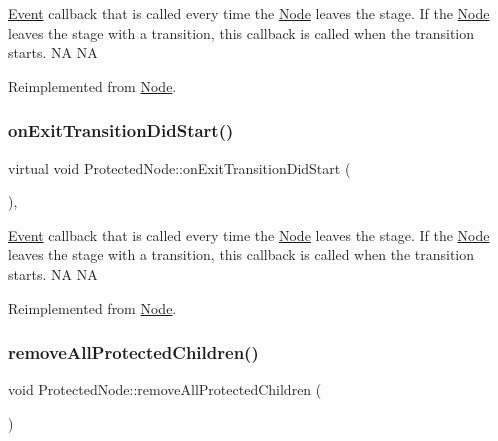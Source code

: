 \hyperlink{classEvent}{Event} callback that is called every time the \hyperlink{classNode}{Node} leaves the \textquotesingle{}stage\textquotesingle{}. If the \hyperlink{classNode}{Node} leaves the \textquotesingle{}stage\textquotesingle{} with a transition, this callback is called when the transition starts.  NA  NA 

Reimplemented from \hyperlink{classNode_a11686054c0d2edd292a53aa9702aaece}{Node}.

\mbox{\label{classProtectedNode_a3efa91524a31d8f0919be2db8af1ddc9}} 
\subsubsection{\texorpdfstring{on\+Exit\+Transition\+Did\+Start()}{onExitTransitionDidStart()}\hspace{0.1cm}{\footnotesize\ttfamily [2/2]}}
{\footnotesize\ttfamily virtual void Protected\+Node\+::on\+Exit\+Transition\+Did\+Start (\begin{DoxyParamCaption}{ }\end{DoxyParamCaption})\hspace{0.3cm}{\ttfamily [override]}, {\ttfamily [virtual]}}

\hyperlink{classEvent}{Event} callback that is called every time the \hyperlink{classNode}{Node} leaves the \textquotesingle{}stage\textquotesingle{}. If the \hyperlink{classNode}{Node} leaves the \textquotesingle{}stage\textquotesingle{} with a transition, this callback is called when the transition starts.  NA  NA 

Reimplemented from \hyperlink{classNode_a11686054c0d2edd292a53aa9702aaece}{Node}.

\mbox{\label{classProtectedNode_acf7715345d19c9842db467ffc7345585}} 
\subsubsection{\texorpdfstring{remove\+All\+Protected\+Children()}{removeAllProtectedChildren()}\hspace{0.1cm}{\footnotesize\ttfamily [1/2]}}
{\footnotesize\ttfamily void Protected\+Node\+::remove\+All\+Protected\+Children (\begin{DoxyParamCaption}{ }\end{DoxyParamCaption})\hspace{0.3cm}{\ttfamily [virtual]}}

